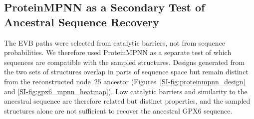 \subsection{ProteinMPNN as a Secondary Test of Ancestral Sequence Recovery}

The EVB paths were selected from catalytic barriers, not from sequence probabilities. We therefore used ProteinMPNN as a separate test of which sequences are compatible with the sampled structures. Designs generated from the two sets of structures overlap in parts of sequence space but remain distinct from the reconstructed node~25 ancestor (Figures~\ref{SI-fig:proteinmpnn_design} and \ref{SI-fig:gpx6_mpnn_heatmap}). Low catalytic barriers and similarity to the ancestral sequence are therefore related but distinct properties, and the sampled structures alone are not sufficient to recover the ancestral GPX6 sequence.
